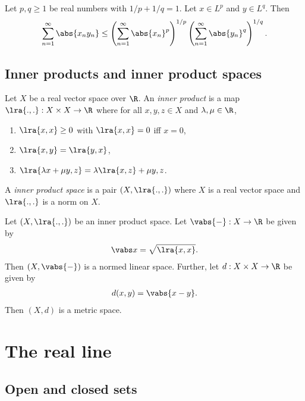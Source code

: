 \documentclass{article}
\begin{document}
\begin{lemma}
	Let $p,q\geq 1$ be real numbers with $1/p+1/q=1$. Let $x\in L^p$ and $y\in L^q$. Then
	\begin{align*}
		\sum_{n=1}^\infty \abs{x_ny_n}\leq
		\left(\sum_{n=1}^\infty\abs{x_n}^p\right)^{1/p}
		\left(\sum_{n=1}^\infty\abs{y_n}^q\right)^{1/q}.
	\end{align*}
\end{lemma}

\subsection{Inner products and inner product spaces}

\begin{definition}
	Let $X$ be a real vector space over $\R$. An \emph{inner product}
	is a map $\lra{.,.}:X\times X\to\R$ where for all $x,y,z\in X$ and
	$\lambda,\mu\in\R$,
	\begin{enumerate}
		\item $\lra{x,x}\geq 0$ with $\lra{x,x}=0$ iff $x=0$,
		\item $\lra{x,y}=\lra{y,x}$,
		\item $\lra{\lambda x+\mu y,z}=\lambda\lra{x,z}+\mu{y,z}$.
	\end{enumerate}
	A \emph{inner product space} is a pair $(X, \lra{.,.})$ where $X$ is a real
	vector space and $\lra{.,.}$ is a norm on $X$.
\end{definition}

\begin{lemma}
	Let $(X,\lra{.,.})$ be an inner product space. Let $\vabs{-}:X\to\R$ be given
	by
	\begin{align*}
		\vabs x = \sqrt{\lra{x,x}}.
	\end{align*}
	Then $(X,\vabs{-})$ is a normed linear space. Further, let $d:X\times X\to\R$
	be given by
	\begin{align*}
		d(x,y)=\vabs{x-y}.
	\end{align*}
	Then $(X,d)$ is a metric space.
\end{lemma}

\section{The real line}

\subsection{Open and closed sets}
\end{document}
